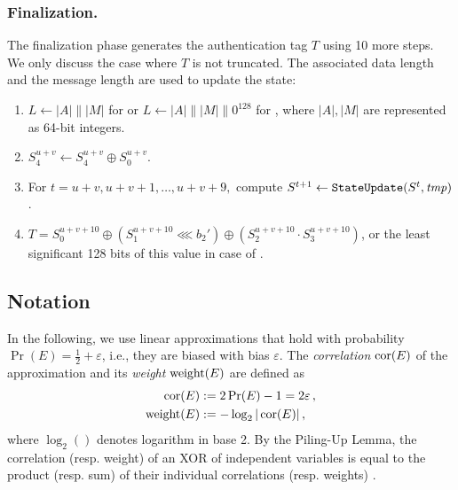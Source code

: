 \subsubsection{Finalization.}
The finalization phase generates the authentication tag $T$ using 10 more \StateUpdate{} steps. We only discuss the case where $T$ is not truncated. The associated data length and the message length are used to update the state:
\begin{enumerate}
\item $L \leftarrow |A| \mathrel\| |M|$ for \MORUS[640] or $L \leftarrow |A| \mathrel\| |M| \mathrel\|0^{128}$ for \MORUS[1280], where $|A|, |M|$ are represented as 64-bit integers.
\item $S^{u+v}_4 \leftarrow S^{u+v}_4 \oplus S^{u+v}_0.$
\item For $t = u+v, u+v+1, \ldots, u+v+9,$ compute
$S^{t+1} \leftarrow \texttt{StateUpdate}{} (S^t, {\it tmp})$.
\item $T = S^{u+v+10}_0 \oplus (S^{u+v+10}_1 \lll b_2') \oplus ( S^{u+v+10}_2 \cdot S^{u+v+10}_3)$, or the least significant 128 bits of this value in case of \MORUS[1280].
\end{enumerate}

\subsection{Notation}
\label{subsec/Notation}

In the following, we use linear approximations \cite{eurocryptMatsui93}
that hold with probability $\Pr(E) = \frac{1}{2} + \varepsilon$, i.e., they are biased with bias $\varepsilon$.
The \emph{correlation} $\operatorname{cor}(E)$ of the approximation and its \emph{weight} $\operatorname{weight}(E)$ are defined as
\begin{align*}
\operatorname{cor}(E) &:= 2\Pr(E)-1 = 2 \varepsilon\,, \\
\operatorname{weight}(E) &:= -\log_2|\operatorname{cor}(E)|\,,
\end{align*}
where $\log_2()$ denotes logarithm in base 2. By the Piling-Up Lemma, the correlation (resp. weight) of an XOR of independent variables is equal to the product (resp. sum) of their individual correlations (resp. weights) \cite{eurocryptMatsui93}.

